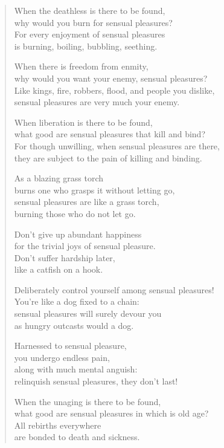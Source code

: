 \documentclass[12pt,openany]{book}%
\begin{document}
\begin{verse}
When the deathless is there to be found, \\
why would you burn for sensual pleasures? \\
For every enjoyment of sensual pleasures \\
is burning, boiling, bubbling, seething. 

When there is freedom from enmity, \\
why would you want your enemy, sensual pleasures? \\
Like kings, fire, robbers, flood, and people you dislike, \\
sensual pleasures are very much your enemy. 

When liberation is there to be found, \\
what good are sensual pleasures that kill and bind? \\
For though unwilling, when sensual pleasures are there, \\
they are subject to the pain of killing and binding. 

As a blazing grass torch \\
burns one who grasps it without letting go, \\
sensual pleasures are like a grass torch, \\
burning those who do not let go. 

Don’t give up abundant happiness \\
for the trivial joys of sensual pleasure. \\
Don’t suffer hardship later, \\
like a catfish on a hook. 

Deliberately control yourself among sensual pleasures! \\
You’re like a dog fixed to a chain: \\
sensual pleasures will surely devour you \\
as hungry outcasts would a dog. 

Harnessed to sensual pleasure, \\
you undergo endless pain, \\
along with much mental anguish: \\
relinquish sensual pleasures, they don’t last! 

When the unaging is there to be found, \\
what good are sensual pleasures in which is old age? \\
All rebirths everywhere \\
are bonded to death and sickness. 


\end{verse}
\end{document}
